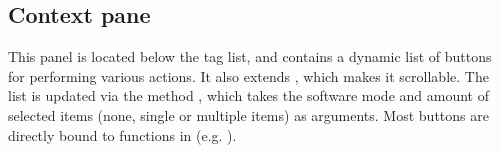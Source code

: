\subsection{Context pane}

This panel is located below the tag list, and contains a dynamic list of
buttons for performing various actions. It also extends
, which makes it scrollable. The list is updated via
the method , which takes the software mode and amount of
selected items (none, single or multiple items) as arguments. Most buttons are
directly bound to functions in  (e.g.
).
